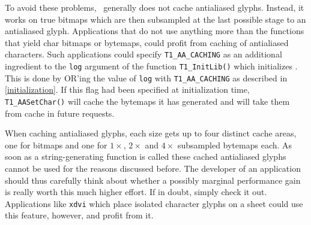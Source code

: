 To avoid these problems, \tonelib\ generally does not cache antialiased
glyphs. Instead, it works on true bitmaps which are then subsampled at the
last possible stage to an antialiased glyph. Applications that do not use
anything more than the functions that yield char bitmaps or bytemaps, could
profit from caching of antialiased characters. Such applications could specify
\verb+T1_AA_CACHING+ as an additional ingredient to the \verb+log+ argument of
the function \verb+T1_InitLib()+ which initializes \tonelib. This is done by
OR'ing the value of \verb+log+ with \verb+T1_AA_CACHING+ as described in
\ref{initialization}. If this flag had been specified at initialization time,
\verb+T1_AASetChar()+ will cache the bytemaps it has generated and will take
them from cache in future requests. 

When caching antialiased glyphs, each size gets up to four distinct cache
areas, one for bitmaps and one for $1\times$, $2\times$ and $4\times$ subsampled
bytemaps each. As soon as a string-generating function is called these cached
antialiased glyphs cannot be used for the reasons discussed before. The
developer of an application should thus carefully think about whether 
a possibly marginal performance gain is really worth this much higher
effort. If in doubt, simply check it out. Applications like \verb+xdvi+ which
place isolated character glyphs on a sheet could use this feature, however, and
profit from it.


